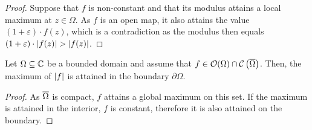 \begin{proof}
Suppose that $f$ is non-constant and that its modulus attains a
local maximum at $z \in \Omega$. As $f$ is an open map, it also
attains the value $(1 + \varepsilon) \cdot f(z)$, which is a
contradiction as the modulus then equals
$(1 + \varepsilon) \cdot \left\lvert f(z)\right\rvert > \left\lvert f(z)\right\rvert$.
\end{proof}

\begin{izrek}
Let $\Omega \subseteq \mathbb{C}$ be a bounded domain and assume that
$f \in \mathcal{O}(\Omega) \cap \mathcal{C} \left(\overline{\Omega}\right)$.
Then, the maximum of $\left\lvert f\right\rvert$ is attained in the boundary
$\partial \Omega$.
\end{izrek}

\begin{proof}
As $\overline{\Omega}$ is compact, $f$ attains a global maximum on
this set. If the maximum is attained in the interior, $f$ is
constant, therefore it is also attained on the boundary.
\end{proof}
